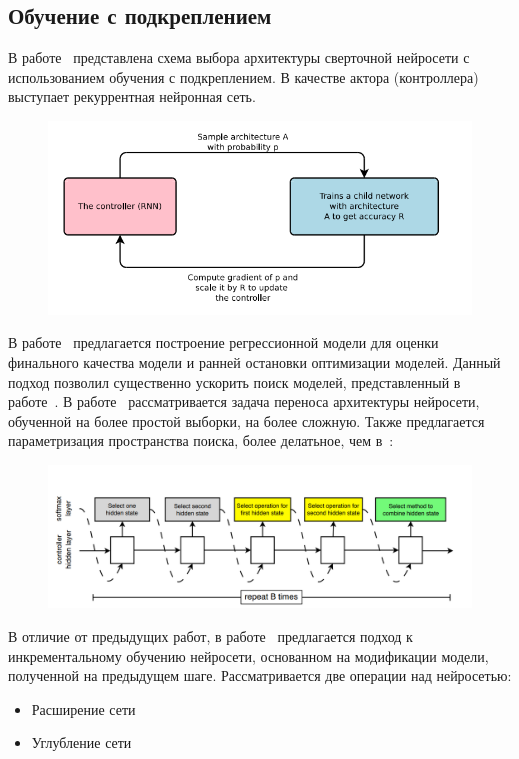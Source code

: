 \subsection{ Обучение с подкреплением}
В работе~\cite{reinf} представлена схема выбора архитектуры сверточной нейросети с использованием обучения с подкреплением. В качестве актора (контроллера) выступает рекуррентная нейронная сеть.
\begin{figure}[H]
\includegraphics[width=\textwidth]{./arch_review_figs/reinf.png}
\end{figure}
В работе~\cite{reinf_predict} предлагается построение регрессионной модели для оценки финального качества модели и ранней остановки оптимизации моделей. Данный подход позволил существенно ускорить поиск моделей, представленный в работе~\cite{reinf}.
В работе~\cite{reinf_transfer} рассматривается задача переноса архитектуры нейросети, обученной на более простой выборки, на более сложную. Также предлагается параметризация пространства поиска, более делатьное, чем в~\cite{reinf}:
\begin{figure}[H]
\includegraphics[width=\textwidth]{./arch_review_figs/reinf2.png}
\end{figure}

В отличие от предыдущих работ, в работе~\cite{reinf_deep2net} предлагается подход к инкрементальному обучению нейросети, основанном на модификации модели, полученной на предыдущем шаге. Рассматривается две операции над нейросетью:
\begin{itemize}
\item Расширение сети
\item Углубление сети
\end{itemize}

